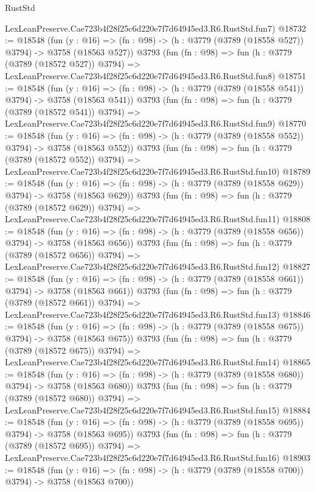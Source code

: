 \begin{lexlean}{RustStd}
\begin{coremodule}
    LexLeanPreserve.Cae723b4f28f25c6d220e7f7d64945ed3.R6.RustStd.fun7)
@18732 := @18548
    (fun (y : @16) => (fn : @98) -> (h : @3779 (@3789 (@18558 @527)) @3794) -> @3758 (@18563 @527))
    @3793
    (fun (fn : @98) =>
    fun (h : @3779 (@3789 (@18572 @527)) @3794) =>
    LexLeanPreserve.Cae723b4f28f25c6d220e7f7d64945ed3.R6.RustStd.fun8)
@18751 := @18548
    (fun (y : @16) => (fn : @98) -> (h : @3779 (@3789 (@18558 @541)) @3794) -> @3758 (@18563 @541))
    @3793
    (fun (fn : @98) =>
    fun (h : @3779 (@3789 (@18572 @541)) @3794) =>
    LexLeanPreserve.Cae723b4f28f25c6d220e7f7d64945ed3.R6.RustStd.fun9)
@18770 := @18548
    (fun (y : @16) => (fn : @98) -> (h : @3779 (@3789 (@18558 @552)) @3794) -> @3758 (@18563 @552))
    @3793
    (fun (fn : @98) =>
    fun (h : @3779 (@3789 (@18572 @552)) @3794) =>
    LexLeanPreserve.Cae723b4f28f25c6d220e7f7d64945ed3.R6.RustStd.fun10)
@18789 := @18548
    (fun (y : @16) => (fn : @98) -> (h : @3779 (@3789 (@18558 @629)) @3794) -> @3758 (@18563 @629))
    @3793
    (fun (fn : @98) =>
    fun (h : @3779 (@3789 (@18572 @629)) @3794) =>
    LexLeanPreserve.Cae723b4f28f25c6d220e7f7d64945ed3.R6.RustStd.fun11)
@18808 := @18548
    (fun (y : @16) => (fn : @98) -> (h : @3779 (@3789 (@18558 @656)) @3794) -> @3758 (@18563 @656))
    @3793
    (fun (fn : @98) =>
    fun (h : @3779 (@3789 (@18572 @656)) @3794) =>
    LexLeanPreserve.Cae723b4f28f25c6d220e7f7d64945ed3.R6.RustStd.fun12)
@18827 := @18548
    (fun (y : @16) => (fn : @98) -> (h : @3779 (@3789 (@18558 @661)) @3794) -> @3758 (@18563 @661))
    @3793
    (fun (fn : @98) =>
    fun (h : @3779 (@3789 (@18572 @661)) @3794) =>
    LexLeanPreserve.Cae723b4f28f25c6d220e7f7d64945ed3.R6.RustStd.fun13)
@18846 := @18548
    (fun (y : @16) => (fn : @98) -> (h : @3779 (@3789 (@18558 @675)) @3794) -> @3758 (@18563 @675))
    @3793
    (fun (fn : @98) =>
    fun (h : @3779 (@3789 (@18572 @675)) @3794) =>
    LexLeanPreserve.Cae723b4f28f25c6d220e7f7d64945ed3.R6.RustStd.fun14)
@18865 := @18548
    (fun (y : @16) => (fn : @98) -> (h : @3779 (@3789 (@18558 @680)) @3794) -> @3758 (@18563 @680))
    @3793
    (fun (fn : @98) =>
    fun (h : @3779 (@3789 (@18572 @680)) @3794) =>
    LexLeanPreserve.Cae723b4f28f25c6d220e7f7d64945ed3.R6.RustStd.fun15)
@18884 := @18548
    (fun (y : @16) => (fn : @98) -> (h : @3779 (@3789 (@18558 @695)) @3794) -> @3758 (@18563 @695))
    @3793
    (fun (fn : @98) =>
    fun (h : @3779 (@3789 (@18572 @695)) @3794) =>
    LexLeanPreserve.Cae723b4f28f25c6d220e7f7d64945ed3.R6.RustStd.fun16)
@18903 := @18548
    (fun (y : @16) => (fn : @98) -> (h : @3779 (@3789 (@18558 @700)) @3794) -> @3758 (@18563 @700))

\end{coremodule}
\end{lexlean}
